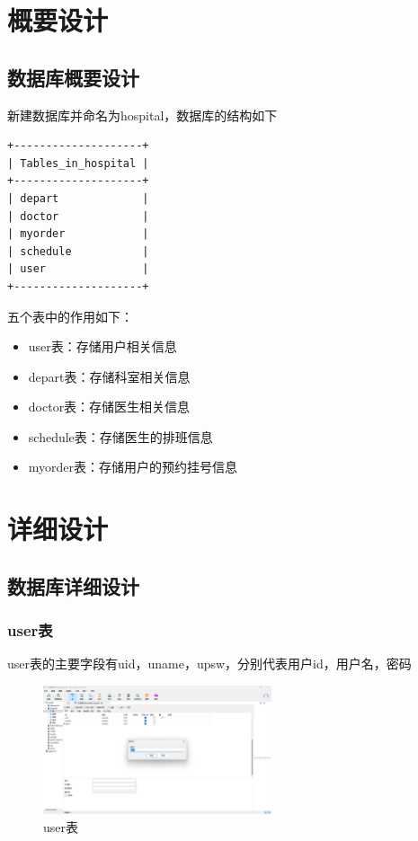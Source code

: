 \documentclass[UTF8,12pt]{article}
\begin{document}
\newpage

\section{概要设计}

\subsection{数据库概要设计}
新建数据库并命名为hospital，数据库的结构如下

\begin{lstlisting}[frame=shadowbox]
+--------------------+
| Tables_in_hospital |
+--------------------+
| depart             |
| doctor             |
| myorder            |
| schedule           |
| user               |
+--------------------+
\end{lstlisting}

五个表中的作用如下：

\begin{itemize}
    \item user表：存储用户相关信息
    \item depart表：存储科室相关信息
    \item doctor表：存储医生相关信息
    \item schedule表：存储医生的排班信息
    \item myorder表：存储用户的预约挂号信息
\end{itemize}

\newpage

\section{详细设计}

\subsection{数据库详细设计}

\subsubsection{user表}
user表的主要字段有uid，uname，upsw，分别代表用户id，用户名，密码

\begin{figure}[htbp]
    \centering
    \includegraphics[width=0.6\textwidth]{imgs/5.png}
    \caption{user表}
\end{figure}
\end{document}
